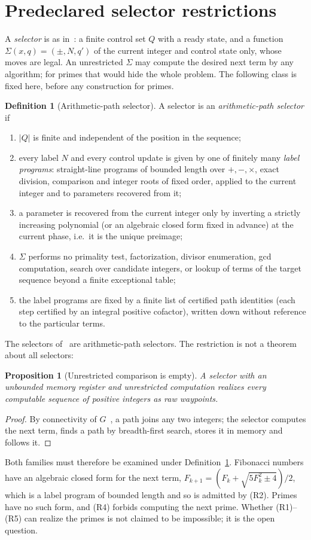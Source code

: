 \documentclass[11pt]{article}
\newtheorem{proposition}[theorem]{Proposition}
\theoremstyle{definition}
\newtheorem{definition}[theorem]{Definition}
\begin{document}
\section{Predeclared selector restrictions}\label{sec:restr}
A \emph{selector} is as in~\cite{u2}: a finite control set $Q$ with a ready state, and a function $\Sigma(x,q)=(\pm,N,q')$ of the current integer and control state only, whose moves are legal.
An unrestricted $\Sigma$ may compute the desired next term by any algorithm; for primes that would hide the whole problem. The following class is fixed here, before any construction for primes.
\begin{definition}[Arithmetic-path selector]\label{def:aps}
A selector is an \emph{arithmetic-path selector} if
\begin{enumerate}[label=(R\arabic*),nosep]
\item $|Q|$ is finite and independent of the position in the sequence;
\item every label $N$ and every control update is given by one of finitely many \emph{label programs}: straight-line programs of bounded length over $+,-,\times$, exact division, comparison and integer roots of fixed order, applied to the current integer and to parameters recovered from it;
\item a parameter is recovered from the current integer only by inverting a strictly increasing polynomial (or an algebraic closed form fixed in advance) at the current phase, i.e.\ it is the unique preimage;
\item $\Sigma$ performs no primality test, factorization, divisor enumeration, gcd computation, search over candidate integers, or lookup of terms of the target sequence beyond a finite exceptional table;
\item the label programs are fixed by a finite list of certified path identities (each step certified by an integral positive cofactor), written down without reference to the particular terms.
\end{enumerate}
\end{definition}
The selectors of~\cite{u2,sq} are arithmetic-path selectors. The restriction is not a theorem about all selectors:
\begin{proposition}[Unrestricted comparison is empty]\label{prop:triv}
A selector with an unbounded memory register and unrestricted computation realizes every computable sequence of positive integers as raw waypoints.
\end{proposition}
\begin{proof} By connectivity of $G$~\cite{u1}, a path joins any two integers; the selector computes the next term, finds a path by breadth-first search, stores it in memory and follows it. \end{proof}
Both families must therefore be examined under Definition~\ref{def:aps}. Fibonacci numbers have an algebraic closed form for the next term, $F_{k+1}=(F_k+\sqrt{5F_k^2\pm4})/2$, which is a label program of bounded length and so is admitted by (R2). Primes have no such form, and (R4) forbids computing the next prime. Whether (R1)--(R5) can realize the primes is not claimed to be impossible; it is the open question.
\end{document}
